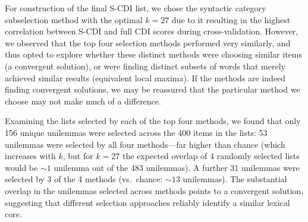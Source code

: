 \documentclass[
  letterpaper,
  DIV=11,
  numbers=noendperiod]{scrartcl}
\begin{document}
\begin{table}

\caption{\label{tbl-bestk}The optimal \(k\) for each sublist selection
method, and measures of average overlap and item difficulty correlations
with held-out languages.}


\end{table}%

For construction of the final S-CDI list, we chose the syntactic
category subselection method with the optimal \(k=27\) due to it
resulting in the highest correlation between S-CDI and full CDI scores
during cross-validation. However, we observed that the top four
selection methods performed very similarly, and thus opted to explore
whether these distinct methods were choosing similar items (a convergent
solution), or were finding distinct subsets of words that merely
achieved similar results (equivalent local maxima). If the methods are
indeed finding convergent solutions, we may be reassured that the
particular method we choose may not make much of a difference.

Examining the lists selected by each of the top four methods, we found
that only 156 unique unilemmas were selected across the 400 items in the
lists: 53 unilemmas were selected by all four methods---far higher than
chance (which increases with \(k\), but for \(k=27\) the expected
overlap of 4 randomly selected lists would be \(\sim 1\) unilemma out of
the 483 unilemmas). A further 31 unilemmas were selected by 3 of the 4
methods (vs.~chance: \(\sim 13\) unilemmas). The substantial overlap in
the unilemmas selected across methods points to a convergent solution,
suggesting that different selection approaches reliably identify a
similar lexical core.
\end{document}
